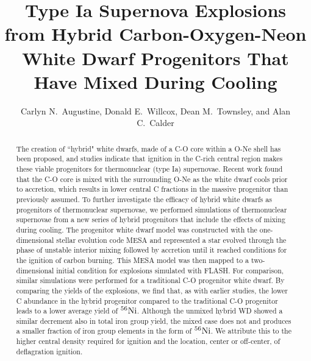 \documentclass[iop,apj]{emulateapj}
\newcommand{\Ni}[1]{\ensuremath{{}^{#1}{\rm Ni}}}
\newcommand{\code}[1]{\textsc{#1}}
\newcommand{\FLASH}{\code{FLASH}}
\begin{document}
\title{Type Ia Supernova Explosions from Hybrid Carbon-Oxygen-Neon White
Dwarf Progenitors That Have Mixed During Cooling}

\author{
Carlyn N.\ Augustine,
Donald E.\ Willcox,
Dean M.\ Townsley,
and Alan C.\ Calder
}


\begin{abstract}
The creation of ``hybrid" white dwarfs, made of a C-O
core within a O-Ne shell has been proposed, and studies indicate that
ignition in the C-rich central region makes these
viable progenitors for thermonuclear (type Ia) supernovae.
Recent work found that the C-O core is mixed with the surrounding O-Ne
as the white dwarf cools prior to accretion, which results in lower central
C fractions in the massive progenitor than previously assumed. To further
investigate the efficacy of hybrid white dwarfs as progenitors of
thermonuclear supernovae, we performed simulations of thermonuclear
supernovae from a new series of hybrid progenitors that include the
effects of mixing during cooling. The progenitor white dwarf model
was constructed with the one-dimensional stellar evolution code MESA and
represented a star evolved through the phase of unstable interior mixing
followed by accretion until it reached conditions for the ignition of
carbon burning. This MESA model was then mapped to a two-dimensional initial
condition for explosions simulated with \FLASH. For comparison, similar
simulations were performed for a traditional C-O progenitor
white dwarf. By comparing the yields of the explosions, we find that, as
with earlier studies, the lower C abundance in the hybrid progenitor compared
to the traditional C-O progenitor leads to a lower average yield of \Ni{56}.
{\color{blue}Although the unmixed hybrid WD showed a similar decrement also in total iron
group yield, the mixed case does not and produces a smaller fraction of iron group elements in the form of \Ni{56}.
We attribute this to the higher central density required for ignition and the location, center or off-center, of deflagration ignition.}
\end{abstract}
\end{document}
